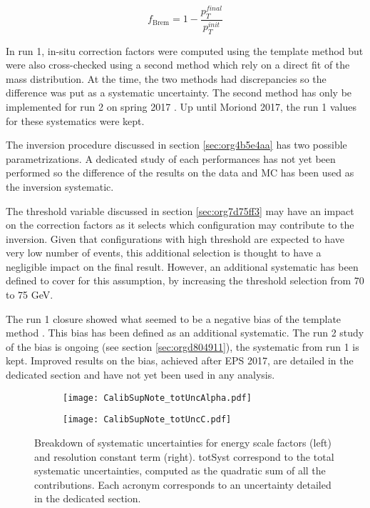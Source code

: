 \begin{equation}
\label{eq:orgd9a7270}
f_{\text{Brem}} = 1 - \frac{p_T^{final}}{p_T^{init}}
\end{equation}

In run 1, in-situ correction factors were computed using the template method but were also cross-checked using a second method which rely on a direct fit of the mass distribution.
At the time, the two methods had discrepancies so the difference was put as a systematic uncertainty.
The second method has only be implemented for run 2 on spring 2017 \cite{ATL-COM-PHYS-2017-757}.
Up until Moriond 2017, the run 1 values for these systematics were kept.

The inversion procedure discussed in section \ref{sec:org4b5e4aa} has two possible para\-me\-tri\-zations.
A dedicated study of each performances has not yet been performed so the difference of the results on the data and MC has been used as the inversion systematic.

The threshold variable discussed in section \ref{sec:org7d75ff3} may have an impact on the correction factors as it selects which configuration may contribute to the inversion.
Given that configurations with high threshold are expected to have very low number of events, this additional selection is thought to have a negligible impact on the final result.
However, an additional systematic has been defined to cover for this assumption, by increasing the threshold selection from 70 to 75 GeV.

The run 1 closure showed what seemed to be a negative bias of the template method \cite{ATL-COM-PHYS-2013-1653}.
This bias has been defined as an additional systematic.
The run 2 study of the bias is ongoing (see section \ref{sec:orgd804911}), the systematic from run 1 is kept.
Improved results on the bias, achieved after EPS 2017, are detailed in the dedicated section and have not yet been used in any analysis.

\begin{figure}
\begin{subfigure}[t]{0.49\linewidth}
\begin{center}
\texttt{[image: CalibSupNote\_totUncAlpha.pdf]}
\end{center}
\end{subfigure}
\begin{subfigure}[t]{0.49\linewidth}
\begin{center}
\texttt{[image: CalibSupNote\_totUncC.pdf]}
\end{center}
\end{subfigure}
\caption{\label{org5c57d23}
  Breakdown of systematic uncertainties for energy scale factors (left) and resolution constant term (right).
  totSyst correspond to the total systematic uncertainties, computed as the quadratic sum of all the contributions.
  Each acronym corresponds to an uncertainty detailed in the dedicated section.
}
\end{figure}



